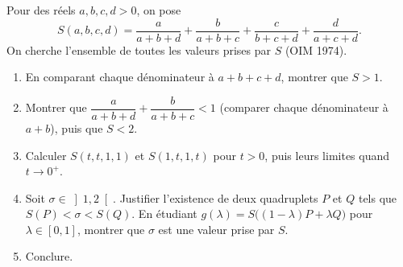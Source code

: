 Pour des réels $a, b, c, d > 0$, on pose
\[
S(a, b, c, d) = \frac{a}{a+b+d} + \frac{b}{a+b+c} + \frac{c}{b+c+d} + \frac{d}{a+c+d}.
\]
On cherche l'ensemble de toutes les valeurs prises par $S$ (OIM 1974).
\begin{enumerate}
  \item En comparant chaque dénominateur à $a + b + c + d$, montrer que $S > 1$.
  \item Montrer que $\dfrac{a}{a+b+d} + \dfrac{b}{a+b+c} < 1$ (comparer
  chaque dénominateur à $a + b$), puis que $S < 2$.
  \item Calculer $S(t, t, 1, 1)$ et $S(1, t, 1, t)$ pour $t > 0$, puis leurs
  limites quand $t \to 0^+$.
  \item Soit $\sigma \in \left]1, 2\right[$. Justifier l'existence de deux
  quadruplets $P$ et $Q$ tels que $S(P) < \sigma < S(Q)$. En étudiant
  $g(\lambda) = S\bigl((1-\lambda)P + \lambda Q\bigr)$ pour
  $\lambda \in [0, 1]$, montrer que $\sigma$ est une valeur prise par $S$.
  \item Conclure.
\end{enumerate}
